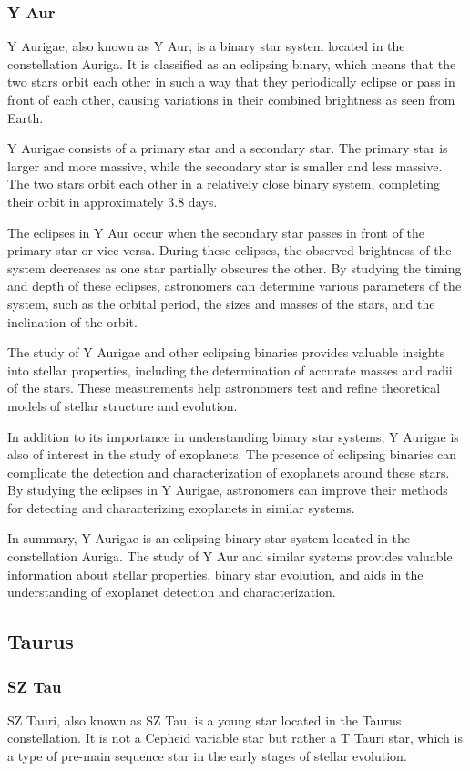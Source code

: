\subsubsection*{ Y Aur }
Y Aurigae, also known as Y Aur, is a binary star system located in the constellation Auriga. It is classified as an eclipsing binary, which means that the two stars orbit each other in such a way that they periodically eclipse or pass in front of each other, causing variations in their combined brightness as seen from Earth.

Y Aurigae consists of a primary star and a secondary star. The primary star is larger and more massive, while the secondary star is smaller and less massive. The two stars orbit each other in a relatively close binary system, completing their orbit in approximately 3.8 days.

The eclipses in Y Aur occur when the secondary star passes in front of the primary star or vice versa. During these eclipses, the observed brightness of the system decreases as one star partially obscures the other. By studying the timing and depth of these eclipses, astronomers can determine various parameters of the system, such as the orbital period, the sizes and masses of the stars, and the inclination of the orbit.

The study of Y Aurigae and other eclipsing binaries provides valuable insights into stellar properties, including the determination of accurate masses and radii of the stars. These measurements help astronomers test and refine theoretical models of stellar structure and evolution.

In addition to its importance in understanding binary star systems, Y Aurigae is also of interest in the study of exoplanets. The presence of eclipsing binaries can complicate the detection and characterization of exoplanets around these stars. By studying the eclipses in Y Aurigae, astronomers can improve their methods for detecting and characterizing exoplanets in similar systems.

In summary, Y Aurigae is an eclipsing binary star system located in the constellation Auriga. The study of Y Aur and similar systems provides valuable information about stellar properties, binary star evolution, and aids in the understanding of exoplanet detection and characterization.

\subsection{Taurus}
\subsubsection*{ SZ Tau }
SZ Tauri, also known as SZ Tau, is a young star located in the Taurus constellation. It is not a Cepheid variable star but rather a T Tauri star, which is a type of pre-main sequence star in the early stages of stellar evolution.


